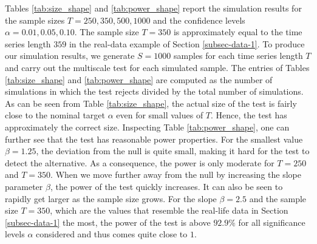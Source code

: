 Tables \ref{tab:size_shape} and \ref{tab:power_shape} report the simulation results for the sample sizes $T=250,350,500, 1000$ and the confidence levels $\alpha = 0.01, 0.05, 0.10$. The sample size $T = 350$ is approximately equal to the time series length $359$ in the real-data example of Section \ref{subsec-data-1}. To produce our simulation results, we generate $S=1000$ samples for each time series length $T$ and carry out the multiscale test for each simulated sample. The entries of Tables \ref{tab:size_shape} and \ref{tab:power_shape} are computed as the number of simulations in which the test rejects divided by the total number of simulations. As can be seen from Table \ref{tab:size_shape}, the actual size of the test is fairly close to the nominal target $\alpha$ even for small values of $T$. Hence, the test has approximately the correct size. Inspecting Table \ref{tab:power_shape}, one can further see that the test has reasonable power properties. For the smallest value $\beta = 1.25$, the deviation from the null is quite small, making it hard for the test to detect the alternative. As a consequence, the power is only moderate for $T=250$ and $T=350$. When we move further away from the null by increasing the slope parameter $\beta$, the power of the test quickly increases. It can also be seen to rapidly get larger as the sample size grows. For the slope $\beta =2.5$ and the sample size $T=350$, which are the values that resemble the real-life data in Section \ref{subsec-data-1} the most, the power of the test is above $92.9\%$ for all significance levels $\alpha$ considered and thus comes quite close to $1$. 


